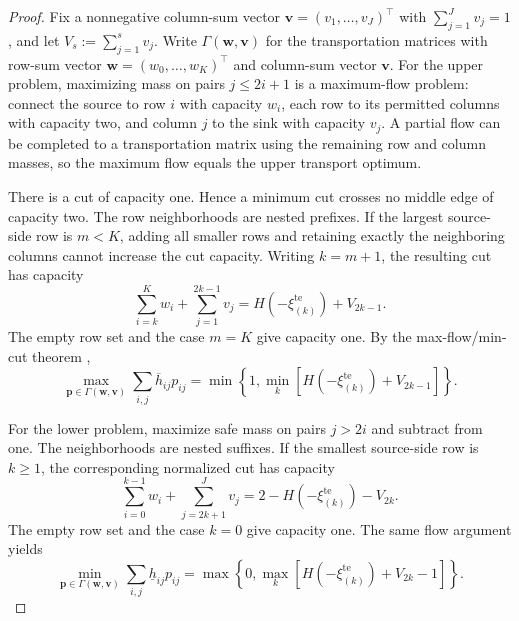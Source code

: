 \documentclass[review,11pt,3p,authoryear,nopreprintline]{elsarticle}
\begin{document}
\begin{proof}
  Fix a nonnegative column-sum vector $\bm v=(v_1,\ldots,v_J)^\top$ with $\sum_{j=1}^J v_j=1$, and let $V_s:=\sum_{j=1}^s v_j$. Write $\Gamma(\bm w,\bm v)$ for the transportation matrices with row-sum vector $\bm w=(w_0,\ldots,w_K)^\top$ and column-sum vector $\bm v$. For the upper problem, maximizing mass on pairs $j\le2i+1$ is a maximum-flow problem: connect the source to row $i$ with capacity $w_i$, each row to its permitted columns with capacity two, and column $j$ to the sink with capacity $v_j$. A partial flow can be completed to a transportation matrix using the remaining row and column masses, so the maximum flow equals the upper transport optimum.

  There is a cut of capacity one. Hence a minimum cut crosses no middle edge of capacity two. The row neighborhoods are nested prefixes. If the largest source-side row is $m<K$, adding all smaller rows and retaining exactly the neighboring columns cannot increase the cut capacity. Writing $k=m+1$, the resulting cut has capacity
  \[
    \sum_{i=k}^K w_i+\sum_{j=1}^{2k-1}v_j
    =H\left(-\xi_{(k)}^{\mathrm{te}}\right)+V_{2k-1}.
  \]
  The empty row set and the case $m=K$ give capacity one. By the max-flow/min-cut theorem \citep{F.F56},
  \begin{equation}
    \max_{\bm p\in\Gamma(\bm w,\bm v)}
      \sum_{i,j}\overline h_{ij}p_{ij}
    =\min\left\{1,\min_k[H\left(-\xi_{(k)}^{\mathrm{te}}\right)+V_{2k-1}]\right\}.
    \label{eq-fixed-column-upper}
  \end{equation}

  For the lower problem, maximize safe mass on pairs $j>2i$ and subtract from one. The neighborhoods are nested suffixes. If the smallest source-side row is $k\ge1$, the corresponding normalized cut has capacity
  \[
    \sum_{i=0}^{k-1}w_i+\sum_{j=2k+1}^Jv_j
    =2-H\left(-\xi_{(k)}^{\mathrm{te}}\right)-V_{2k}.
  \]
  The empty row set and the case $k=0$ give capacity one. The same flow argument yields
  \begin{equation}
    \min_{\bm p\in\Gamma(\bm w,\bm v)}
      \sum_{i,j}\underline h_{ij}p_{ij}
    =\max\left\{0,\max_k[H\left(-\xi_{(k)}^{\mathrm{te}}\right)+V_{2k}-1]\right\}.
    \label{eq-fixed-column-lower}
  \end{equation}


\end{proof}
\end{document}
